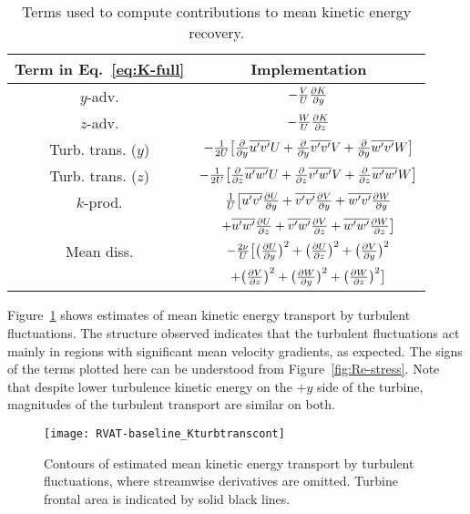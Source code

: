 \begin{table}
    \centering
    \begin{tabular}{c|c}
        Term in Eq.~\ref{eq:K-full} & Implementation \\
        \hline
        $y$-adv. & $-\frac{V}{U}\frac{\partial K}{\partial y}$ \\
        $z$-adv.  & $-\frac{W}{U}\frac{\partial K}{\partial z}$ \\
        Turb. trans. ($y$) & $-\frac{1}{2U} \big{[} \frac{\partial }{\partial y}\overline{u'v'}U
        + \frac{\partial }{\partial y}\overline{v'v'}V + \frac{\partial }{\partial y}\overline{w'v'}W \big{]} $\\
        Turb. trans. ($z$)  & $-\frac{1}{2U} \big{[} \frac{\partial }{\partial z}\overline{u'w'}U
        + \frac{\partial }{\partial z}\overline{v'w'}V + \frac{\partial }{\partial z}\overline{w'w'}W \big{]} $\\
        $k$-prod.  & $\frac{1}{U} \big{[} \overline{u'v'}\frac{\partial U}{\partial y}
        + \overline{v'v'}\frac{\partial V}{\partial y}
        + \overline{w'v'}\frac{\partial W}{\partial y} $ \\
        & $ + \overline{u'w'}\frac{\partial U}{\partial z}
        + \overline{v'w'}\frac{\partial V}{\partial z}
        + \overline{w'w'}\frac{\partial W}{\partial z}
        \big{]} $ \\
        Mean diss.   & $ - \frac{2 \nu}{U} \big{[}
        \big{(} \frac{\partial U}{\partial y} \big{)}^2
        + \big{(} \frac{\partial U}{\partial z} \big{)}^2
        + \big{(} \frac{\partial V}{\partial y} \big{)}^2 $ \\
        & $
        + \big{(} \frac{\partial V}{\partial z} \big{)}^2
        + \big{(} \frac{\partial W}{\partial y} \big{)}^2
        + \big{(} \frac{\partial W}{\partial z} \big{)}^2
        \big{]} $ \\
    \end{tabular}
    \caption{Terms used to compute contributions to mean kinetic energy recovery.}
    \label{tab:RVAT-baseline-eqs}
\end{table}

Figure~\ref{fig:RVAT-baseline-Kturbtrans} shows estimates of mean kinetic energy
transport by turbulent fluctuations. The structure observed indicates that the
turbulent fluctuations act mainly in regions with significant mean velocity
gradients, as expected. The signs of the terms plotted here can be understood
from Figure~\ref{fig:Re-stress}. Note that despite lower turbulence kinetic
energy on the $+y$ side of the turbine, magnitudes of the turbulent transport
are similar on both.

\begin{figure}
    \centering

    \texttt{[image: RVAT-baseline\_Kturbtranscont]}

    \caption{Contours of estimated mean kinetic energy transport by turbulent
        fluctuations, where streamwise derivatives are omitted. Turbine frontal area
        is indicated by solid black lines.}

    \label{fig:RVAT-baseline-Kturbtrans}
\end{figure}

